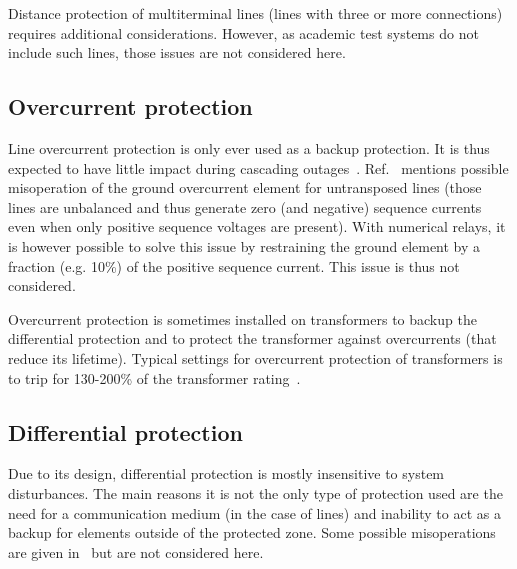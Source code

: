 Distance protection of multiterminal lines (lines with three or more connections) requires additional considerations. However, as academic test systems do not include such lines, those issues are not considered here.


\subsection{Overcurrent protection}

Line overcurrent protection is only ever used as a backup protection. It is thus expected to have little impact during cascading outages~\cite{PSRCreportProtectionMisop}. Ref.~\cite{PSRCreportProtectionMisop} mentions possible misoperation of the ground overcurrent element for untransposed lines (those lines are unbalanced and thus generate zero (and negative) sequence currents even when only positive sequence voltages are present). With numerical relays, it is however possible to solve this issue by restraining the ground element by a fraction (e.g. 10\%) of the positive sequence current. This issue is thus not considered.

Overcurrent protection is sometimes installed on transformers to backup the differential protection and to protect the transformer against overcurrents (that reduce its lifetime). Typical settings for overcurrent protection of transformers is to trip for 130-200\% of the transformer rating~\cite{ENTSOEdefencePlan}.

\subsection{Differential protection}

Due to its design, differential protection is mostly insensitive to system disturbances. The main reasons it is not the only type of protection used are the need for a communication medium (in the case of lines) and inability to act as a backup for elements outside of the protected zone. Some possible misoperations are given in~\cite{PSRCreportProtectionMisop} but are not considered here.


